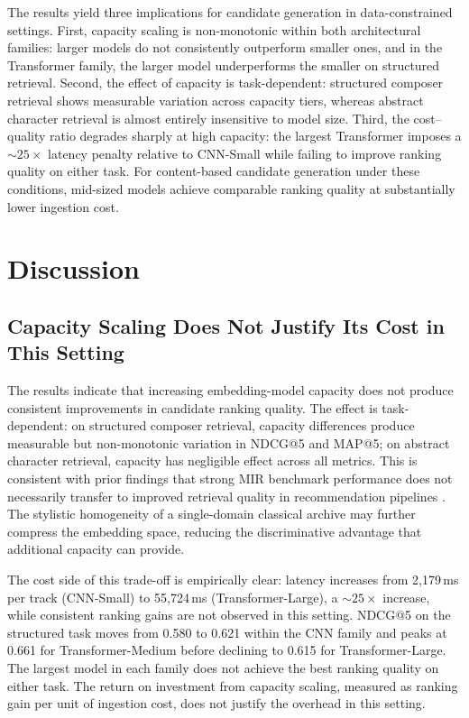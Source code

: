 \documentclass{CPP}
\begin{document}
The results yield three implications for candidate generation in data-constrained settings. First, capacity scaling is non-monotonic within both architectural families: larger models do not consistently outperform smaller ones, and in the Transformer family, the larger model underperforms the smaller on structured retrieval. Second, the effect of capacity is task-dependent: structured composer retrieval shows measurable variation across capacity tiers, whereas abstract character retrieval is almost entirely insensitive to model size. Third, the cost--quality ratio degrades sharply at high capacity: the largest Transformer imposes a ${\sim}25{\times}$ latency penalty relative to CNN-Small while failing to improve ranking quality on either task. For content-based candidate generation under these conditions, mid-sized models achieve comparable ranking quality at substantially lower ingestion cost.

\chapter{Discussion}

\section{Capacity Scaling Does Not Justify Its Cost in This Setting}

The results indicate that increasing embedding-model capacity does not produce consistent improvements in candidate ranking quality. The effect is task-dependent: on structured composer retrieval, capacity differences produce measurable but non-monotonic variation in NDCG@5 and MAP@5; on abstract character retrieval, capacity has negligible effect across all metrics. This is consistent with prior findings that strong MIR benchmark performance does not necessarily transfer to improved retrieval quality in recommendation pipelines \cite{tamm2024}. The stylistic homogeneity of a single-domain classical archive may further compress the embedding space, reducing the discriminative advantage that additional capacity can provide.

The cost side of this trade-off is empirically clear: latency increases from 2{,}179\,ms per track (CNN-Small) to 55{,}724\,ms (Transformer-Large), a ${\sim}25{\times}$ increase, while consistent ranking gains are not observed in this setting. NDCG@5 on the structured task moves from 0.580 to 0.621 within the CNN family and peaks at 0.661 for Transformer-Medium before declining to 0.615 for Transformer-Large. The largest model in each family does not achieve the best ranking quality on either task. The return on investment from capacity scaling, measured as ranking gain per unit of ingestion cost, does not justify the overhead in this setting.
\end{document}
